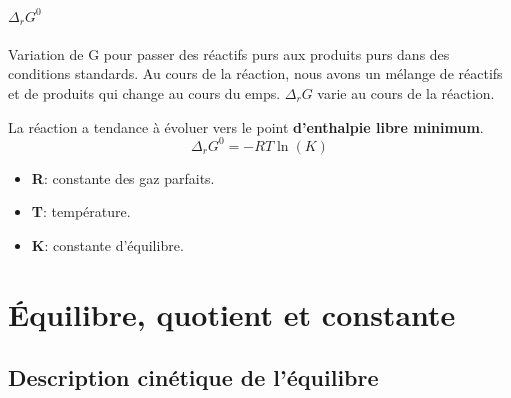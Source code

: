\documentclass[10pt,a4paper]{book}
\newcommand{\x}{$\times$ }
\begin{document}
\paragraph{\(\Delta_rG^0\)} Variation de G pour passer des réactifs purs aux produits purs dans des conditions standards. Au cours de la réaction, nous avons un mélange de réactifs et de produits qui change au cours du emps. \(\Delta_rG\) varie au cours de la réaction. \par
La réaction a tendance à évoluer vers le point \textbf{d'enthalpie libre minimum}.
\[\Delta_rG^0 = -RT\ln(K)\] \label{eq:GR0}
\begin{itemize}
\item \textbf{R}: constante des gaz parfaits.
\item \textbf{T}: température.
\item \textbf{K}: constante d'équilibre.
\end{itemize}

\section{Équilibre, quotient et constante} %

\subsection{Description cinétique de l'équilibre}
\end{document}
